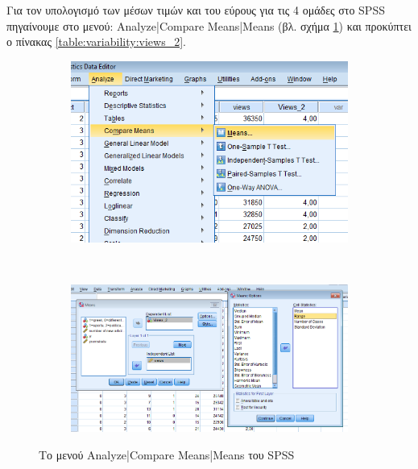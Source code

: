 \documentclass{assignment}
\begin{document}
\begin{Assignment}[Μέρος Α]
\begin{description}
\end{description}

Για τον υπολογισμό των μέσων τιμών και του εύρους για τις 4 ομάδες στο SPSS πηγαίνουμε στο μενού: Analyze|Compare Means|Means (βλ. σχήμα \ref{fig:variability:views_2}) και προκύπτει ο πίνακας \ref{table:variability:views_2}.

\begin{figure}[htbp]
  \centering
  \begin{subfigure}[b]{0.5\textwidth}
     \includegraphics[width=\textwidth,height=0.25\textheight]{images/menu_mean_view_2.png}
  \end{subfigure}%
   ~ %
  \begin{subfigure}[b]{0.5\textwidth}
    \includegraphics[width=\textwidth,height=0.25\textheight]{images/mean_view_2.png}
  \end{subfigure}
  \caption{Το μενού Analyze|Compare Means|Means του SPSS}
\label{fig:variability:views_2}
\end{figure}



\end{Assignment}
\end{document}
